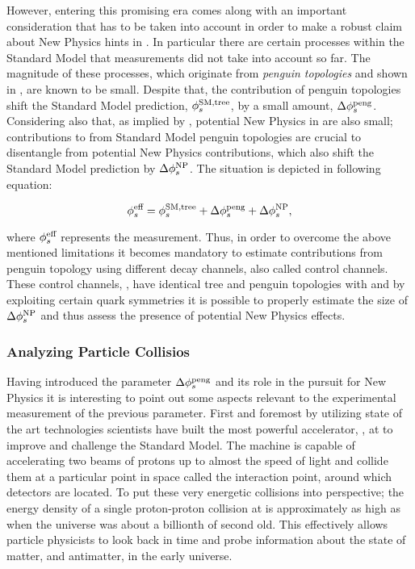 However, entering this promising era comes along with an important consideration
that has to be taken into account in order to make a robust claim about New Physics hints in \phis.
In particular there are certain processes within the Standard Model that \phis measurements
did not take into account so far. The magnitude of these processes, which originate from {\it penguin topologies}
and shown in , are known to be small. Despite that, the
contribution of penguin topologies shift the Standard Model prediction,
$\phi_{s}^{\tiny \text{SM,tree}}$, by a small amount, $\Delta\phi_{s}^{\tiny\text{peng}}$. Considering
also that, as implied by , potential New Physics
in \phis are also small; contributions to \phis from Standard Model penguin
topologies are crucial to disentangle from potential New Physics contributions, which also
shift the Standard Model prediction by $\Delta\phi_{s}^{\tiny \text{NP}}$.
The situation is depicted in following equation:

\begin{equation}
\centering
 \phis^{\text {eff}} = \phis^{\tiny \text{SM,tree}} + \Delta\phiS{peng} + \Delta\phis^{\tiny \text{NP}},
 \label{app_phis_sm_peng}
\end{equation}

\noindent where $\phi_{s}^{\text {eff}}$ represents the \phis measurement.
Thus, in order to overcome the above mentioned limitations it becomes mandatory to estimate
contributions from penguin topology using different decay channels, also called control channels.
These control channels, \eg \BsJpsiKst, have identical tree and penguin topologies with \BsJpsiPhi
and by exploiting certain quark symmetries it is possible to properly estimate the size of
$\Delta\phi_{s}^{\tiny \text{NP}}$ and thus assess the presence of potential New Physics effects.

\subsubsection{Analyzing Particle Collisios}

Having introduced the parameter $\Delta\phi_{s}^{\tiny\text{peng}}$ and its role in the pursuit for New Physics
it is interesting to point out some aspects relevant to the experimental measurement of the previous parameter.
First and foremost by utilizing state of the art technologies scientists have built the most
powerful accelerator, \lhc, at \cern to improve and challenge the Standard Model. The machine is
capable of accelerating two beams of protons up to almost the speed of light and collide them at
a particular point in space called the interaction point, around which detectors are located.
To put these very energetic collisions into perspective; the energy density of a single proton-proton
collision at \lhc is approximately as high as when the universe was about a billionth of second old.
This effectively allows particle physicists to look back in time and probe information about the
state of matter, and antimatter, in the early universe.


